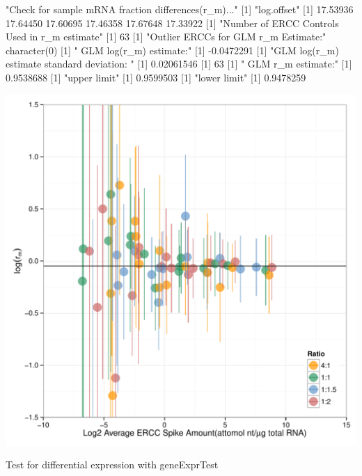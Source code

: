 \documentclass{article}
\begin{document}
\begin{center}
\begin{Schunk}
\begin{Soutput}
[1] "Check for sample mRNA fraction differences(r_m)..."
[1] "log.offset"
[1] 17.53936 17.64450 17.60695 17.46358 17.67648 17.33922
[1] "Number of ERCC Controls Used in r_m estimate"
[1] 63
[1] "Outlier ERCCs for GLM r_m Estimate:"
character(0)
[1] " GLM log(r_m) estimate:"
[1] -0.0472291
[1] "GLM log(r_m) estimate standard deviation: "
[1] 0.02061546
[1] 63
[1] " GLM r_m estimate:"
[1] 0.9538688
[1] "upper limit"
[1] 0.9599503
[1] "lower limit"
[1] 0.9478259
\end{Soutput}
\end{Schunk}
\includegraphics{erccdashboardVignetteTry2-est_r_m}
\end{center}
Test for differential expression with geneExprTest
\end{document}
